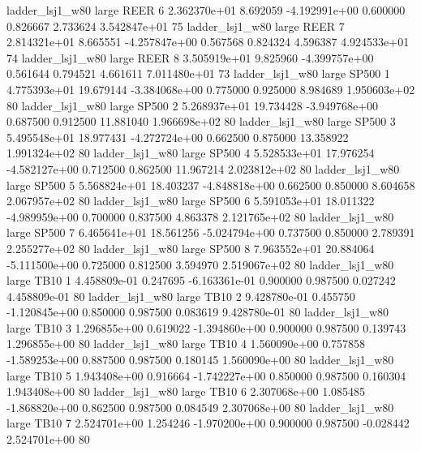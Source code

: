     ladder_lsj1_w80      large     REER                 6 2.362370e+01      8.692059 -4.192991e+00 0.600000 0.826667       2.733624 3.542847e+01 75
    ladder_lsj1_w80      large     REER                 7 2.814321e+01      8.665551 -4.257847e+00 0.567568 0.824324       4.596387 4.924533e+01 74
    ladder_lsj1_w80      large     REER                 8 3.505919e+01      9.825960 -4.399757e+00 0.561644 0.794521       4.661611 7.011480e+01 73
    ladder_lsj1_w80      large    SP500                 1 4.775393e+01     19.679144 -3.384068e+00 0.775000 0.925000       8.984689 1.950603e+02 80
    ladder_lsj1_w80      large    SP500                 2 5.268937e+01     19.734428 -3.949768e+00 0.687500 0.912500      11.881040 1.966698e+02 80
    ladder_lsj1_w80      large    SP500                 3 5.495548e+01     18.977431 -4.272724e+00 0.662500 0.875000      13.358922 1.991324e+02 80
    ladder_lsj1_w80      large    SP500                 4 5.528533e+01     17.976254 -4.582127e+00 0.712500 0.862500      11.967214 2.023812e+02 80
    ladder_lsj1_w80      large    SP500                 5 5.568824e+01     18.403237 -4.848818e+00 0.662500 0.850000       8.604658 2.067957e+02 80
    ladder_lsj1_w80      large    SP500                 6 5.591053e+01     18.011322 -4.989959e+00 0.700000 0.837500       4.863378 2.121765e+02 80
    ladder_lsj1_w80      large    SP500                 7 6.465641e+01     18.561256 -5.024794e+00 0.737500 0.850000       2.789391 2.255277e+02 80
    ladder_lsj1_w80      large    SP500                 8 7.963552e+01     20.884064 -5.111500e+00 0.725000 0.812500       3.594970 2.519067e+02 80
    ladder_lsj1_w80      large     TB10                 1 4.458809e-01      0.247695 -6.163361e-01 0.900000 0.987500       0.027242 4.458809e-01 80
    ladder_lsj1_w80      large     TB10                 2 9.428780e-01      0.455750 -1.120845e+00 0.850000 0.987500       0.083619 9.428780e-01 80
    ladder_lsj1_w80      large     TB10                 3 1.296855e+00      0.619022 -1.394860e+00 0.900000 0.987500       0.139743 1.296855e+00 80
    ladder_lsj1_w80      large     TB10                 4 1.560090e+00      0.757858 -1.589253e+00 0.887500 0.987500       0.180145 1.560090e+00 80
    ladder_lsj1_w80      large     TB10                 5 1.943408e+00      0.916664 -1.742227e+00 0.850000 0.987500       0.160304 1.943408e+00 80
    ladder_lsj1_w80      large     TB10                 6 2.307068e+00      1.085485 -1.868820e+00 0.862500 0.987500       0.084549 2.307068e+00 80
    ladder_lsj1_w80      large     TB10                 7 2.524701e+00      1.254246 -1.970200e+00 0.900000 0.987500      -0.028442 2.524701e+00 80
